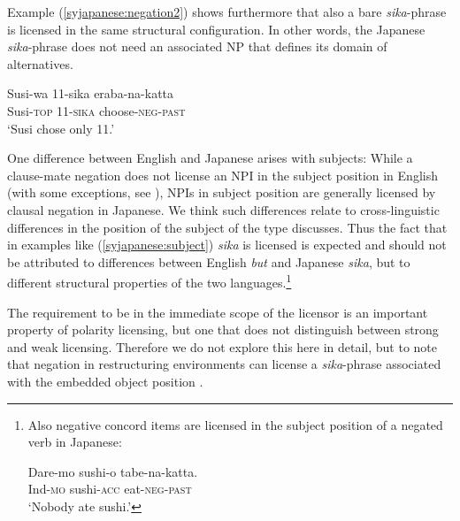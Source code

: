 \documentclass[output=paper]{langscibook}
\begin{document}
Example (\ref{syjapanese:negation2}) shows furthermore that also a bare \emph{sika}-phrase is licensed in the same structural configuration. In other words, the Japanese \emph{sika}-phrase does not need an associated NP that defines its domain of alternatives.

\ea \label{syjapanese:negation2}
\gll Susi-wa 11-sika eraba-na-katta\\
     Susi-\textsc{top} 11-\textsc{sika} choose-\textsc{neg}-\textsc{past}\\
\glt `Susi chose only 11.'\z


One difference between English and Japanese arises with subjects:
While a clause-mate negation does not license an NPI in the subject position in English (with some exceptions, see \citealt{uribe95a}), NPIs in subject position are generally licensed by clausal negation in Japanese.
We think such differences relate to cross-linguistic differences in the position of the subject of the type \citet{wurmbrand06a} discusses.
Thus the fact that in examples like (\ref{syjapanese:subject}) \emph{sika} is licensed is expected and should not be attributed to differences between English \emph{but} and Japanese \emph{sika}, but to different structural properties of the two languages.\footnote{Also negative concord items are licensed in the subject position of a negated verb in Japanese:

\ea \label{syNegQ-1}
\gll Dare-mo sushi-o tabe-na-katta.\\
Ind-\textsc{mo} sushi-\textsc{acc} eat-\textsc{neg}-\textsc{past}\\
\glt `Nobody ate sushi.'\z}


\z


The requirement to be in the immediate scope of the licensor is an important property of polarity licensing, but one that does not distinguish between strong and weak licensing.
Therefore we do not explore this here in detail, but to note that negation in restructuring environments \citep{wurmbrand01b} can license a  \emph{sika}-phrase associated with the embedded object position \citep{muraki78}.

\end{document}
